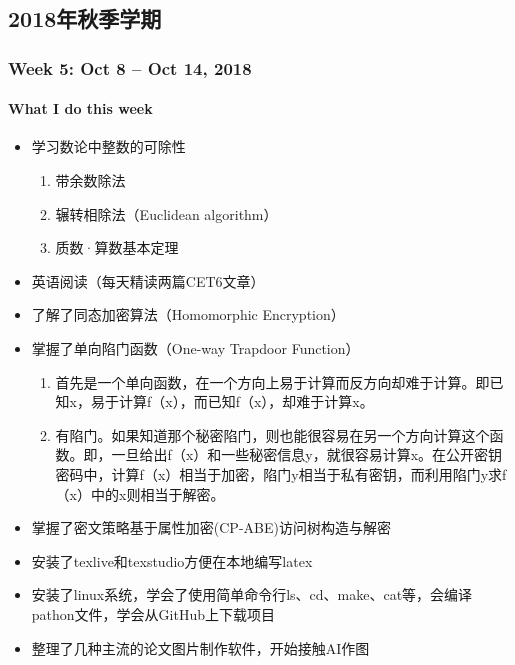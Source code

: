\documentclass[a4paper]{article}
\begin{document}
\begin{CJK}{UTF8}{gbsn}
\begin{comment}
\end{abstract}
\end{comment}

\part{2018年秋季学期}

\section{Week 5: Oct 8 -- Oct 14, 2018}

\subsection{What I do this week}

\begin{itemize}
\item 学习数论中整数的可除性
\begin{enumerate}[1)]
    \item 带余数除法
    \item 辗转相除法（Euclidean algorithm）
    \item 质数·算数基本定理
\end{enumerate}
\item 英语阅读（每天精读两篇CET6文章）
\item 了解了同态加密算法（Homomorphic Encryption）
\item 掌握了单向陷门函数（One-way Trapdoor Function）
\begin{enumerate}[1)]
	\item 首先是一个单向函数，在一个方向上易于计算而反方向却难于计算。即已知x，易于计算f（x），而已知f（x），却难于计算x。
	\item 有陷门。如果知道那个秘密陷门，则也能很容易在另一个方向计算这个函数。即，一旦给出f（x）和一些秘密信息y，就很容易计算x。在公开密钥密码中，计算f（x）相当于加密，陷门y相当于私有密钥，而利用陷门y求f（x）中的x则相当于解密。
\end{enumerate}
\item 掌握了密文策略基于属性加密(CP-ABE)访问树构造与解密
\item 安装了texlive和texstudio方便在本地编写latex
\item 安装了linux系统，学会了使用简单命令行ls、cd、make、cat等，会编译pathon文件，学会从GitHub上下载项目
\item 整理了几种主流的论文图片制作软件，开始接触AI作图

\end{itemize}


\end{CJK}
\end{document}
